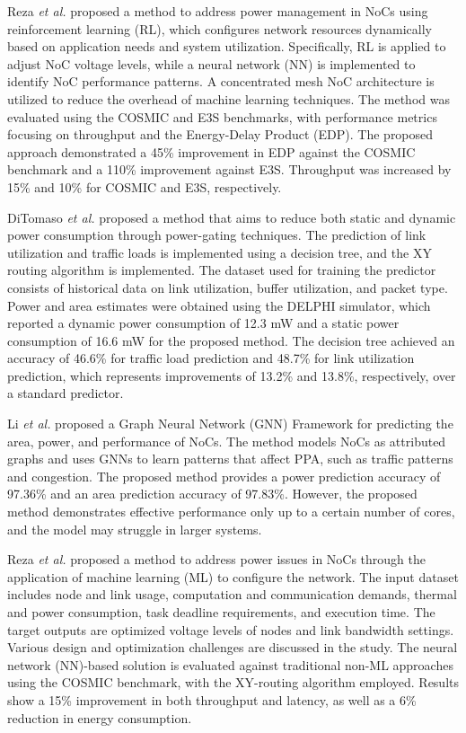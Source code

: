 \documentclass[conference]{IEEEtran}
\begin{document}
Reza \textit{et al.}\cite{5} proposed a method to address power management in NoCs using reinforcement learning (RL), which configures network resources dynamically based on application needs and system utilization. Specifically, RL is applied to adjust NoC voltage levels, while a neural network (NN) is implemented to identify NoC performance patterns. A concentrated mesh NoC architecture is utilized to reduce the overhead of machine learning techniques. The method was evaluated using the COSMIC and E3S benchmarks, with performance metrics focusing on throughput and the Energy-Delay Product (EDP). The proposed approach demonstrated a 45\% improvement in EDP against the COSMIC benchmark and a 110\% improvement against E3S. Throughput was increased by 15\% and 10\% for COSMIC and E3S, respectively.

DiTomaso \textit{et al.}\cite{6} proposed a method that aims to reduce both static and dynamic power consumption through power-gating techniques. The prediction of link utilization and traffic loads is implemented using a decision tree, and the XY routing algorithm is implemented. The dataset used for training the predictor consists of historical data on link utilization, buffer utilization, and packet type. Power and area estimates were obtained using the DELPHI simulator, which reported a dynamic power consumption of 12.3 mW and a static power consumption of 16.6 mW for the proposed method. The decision tree achieved an accuracy of 46.6\% for traffic load prediction and 48.7\% for link utilization prediction, which represents improvements of 13.2\% and 13.8\%, respectively, over a standard predictor.

Li \textit{et al.}\cite{7} proposed a Graph Neural Network (GNN) Framework for predicting the area, power, and performance of NoCs. The method models NoCs as attributed graphs and uses GNNs to learn patterns that affect PPA, such as traffic patterns and congestion. The proposed method provides a power prediction accuracy of 97.36\% and an area prediction accuracy of 97.83\%. However, the proposed method demonstrates effective performance only up to a certain number of cores, and the model may struggle in larger systems.

Reza \textit{et al.}\cite{8} proposed a method to address power issues in NoCs through the application of machine learning (ML) to configure the network. The input dataset includes node and link usage, computation and communication demands, thermal and power consumption, task deadline requirements, and execution time. The target outputs are optimized voltage levels of nodes and link bandwidth settings. Various design and optimization challenges are discussed in the study. The neural network (NN)-based solution is evaluated against traditional non-ML approaches using the COSMIC benchmark, with the XY-routing algorithm employed. Results show a 15\% improvement in both throughput and latency, as well as a 6\% reduction in energy consumption.
\end{document}
